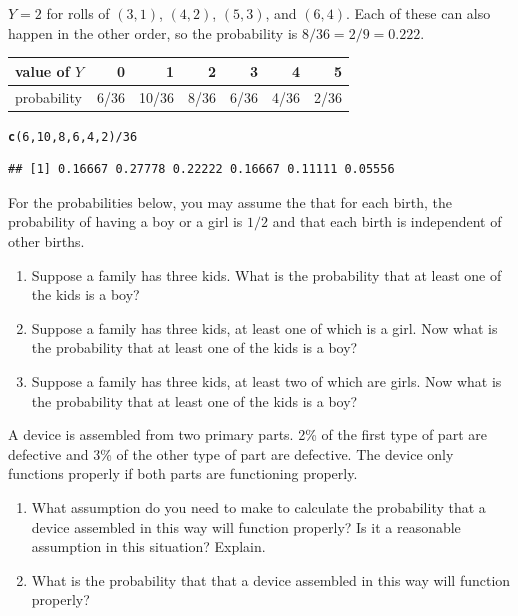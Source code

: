 \documentclass[twoside]{book}\usepackage[]{graphicx}\usepackage[]{xcolor}
\makeatletter
\newcommand{\hlnum}[1]{\textcolor[rgb]{0.686,0.059,0.569}{#1}}%
\newcommand{\hlopt}[1]{\textcolor[rgb]{0,0,0}{#1}}%
\newcommand{\hlstd}[1]{\textcolor[rgb]{0.345,0.345,0.345}{#1}}%
\newcommand{\hlkwd}[1]{\textcolor[rgb]{0.737,0.353,0.396}{\textbf{#1}}}%
\newenvironment{kframe}{%
 \def\at@end@of@kframe{}%
 \ifinner\ifhmode%
  \def\at@end@of@kframe{\end{minipage}}%
  \begin{minipage}{\columnwidth}%
 \fi\fi%
 \def\FrameCommand##1{\hskip\@totalleftmargin \hskip-\fboxsep
 \colorbox{shadecolor}{##1}\hskip-\fboxsep
     \hskip-\linewidth \hskip-\@totalleftmargin \hskip\columnwidth}%
 \MakeFramed {\advance\hsize-\width
   \@totalleftmargin\z@ \linewidth\hsize
   \@setminipage}}%
 {\par\unskip\endMakeFramed%
 \at@end@of@kframe}
\newenvironment{knitrout}{}{} %
\makeatother
\begin{document}
\begin{solution}
	$Y = 2$ for rolls of $(3,1)$, $(4,2)$, $(5,3)$, and $(6,4)$.  Each of these 
	can also happen in the other order, so the probability is $8/36 = 2/9 = 0.222$.

\begin{center}
	\begin{tabular}{lrrrrrr}
		\hline
		value of $Y$ & 0 & 1 & 2 & 3 & 4 & 5 \\
		\hline
		probability & 6/36 & 10/36 & 8/36 & 6/36 & 4/36 & 2/36 \\
		\hline
	\end{tabular}
\end{center}
\begin{knitrout}
\color{fgcolor}\begin{kframe}
\begin{alltt}
\hlkwd{c}\hlstd{(}\hlnum{6}\hlstd{,}\hlnum{10}\hlstd{,}\hlnum{8}\hlstd{,}\hlnum{6}\hlstd{,}\hlnum{4}\hlstd{,}\hlnum{2}\hlstd{)} \hlopt{/} \hlnum{36}
\end{alltt}
\begin{verbatim}
## [1] 0.16667 0.27778 0.22222 0.16667 0.11111 0.05556
\end{verbatim}
\end{kframe}
\end{knitrout}
\end{solution}

\begin{problem}
For the probabilities below, you may assume the that for each birth,
the probability of having a boy or a girl is $1/2$ and that each birth is
independent of other births.
\begin{enumerate}
\item
Suppose a family has three kids. 
What is the probability that at least one of the kids is a boy?
\item
Suppose a family has three kids, at least one of which is a girl.
Now what is the probability that at least one of the kids is a boy?
\item
Suppose a family has three kids, at least two of which are girls.
Now what is the probability that at least one of the kids is a boy?
\end{enumerate}
\end{problem}


\begin{problem}
	A device is assembled from two primary parts.  2\% of the first type of part
	are defective and 3\% of the other type of part are defective.  The device
	only functions properly if both parts are functioning properly.
	\begin{enumerate}
	\item
	What assumption do you need to make to calculate the probability
	that a device assembled in this way will function properly?
	Is it a reasonable assumption in this situation?  Explain.
	\item
	What is the probability that that a device assembled in this way will 
	function properly?
	\end{enumerate}
\end{problem}
\end{document}
